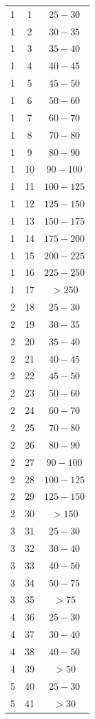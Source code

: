 \begin{center}
\begin{longtable}{|c|c|c|}
\hline 
1 & 1 & $25-30$ \\ 
1 & 2 & $30-35$ \\ 
1 & 3 & $35-40$ \\ 
1 & 4 & $40-45$ \\ 
1 & 5 & $45-50$ \\ 
1 & 6 & $50-60$ \\ 
1 & 7 & $60-70$ \\ 
1 & 8 & $70-80$ \\ 
1 & 9 & $80-90$ \\ 
1 & 10 & $90-100$ \\ 
1 & 11 & $100-125$ \\ 
1 & 12 & $125-150$ \\ 
1 & 13 & $150-175$ \\ 
1 & 14 & $175-200$ \\ 
1 & 15 & $200-225$ \\ 
1 & 16 & $225-250$ \\ 
1 & 17 & $>250$ \\ 
\hline 
2 & 18 & $25-30$ \\ 
2 & 19 & $30-35$ \\ 
2 & 20 & $35-40$ \\ 
2 & 21 & $40-45$ \\ 
2 & 22 & $45-50$ \\ 
2 & 23 & $50-60$ \\ 
2 & 24 & $60-70$ \\ 
2 & 25 & $70-80$ \\ 
2 & 26 & $80-90$ \\ 
2 & 27 & $90-100$ \\ 
2 & 28 & $100-125$ \\ 
2 & 29 & $125-150$ \\ 
2 & 30 & $>150$ \\ 
\hline 
3 & 31 & $25-30$ \\ 
3 & 32 & $30-40$ \\ 
3 & 33 & $40-50$ \\ 
3 & 34 & $50-75$ \\ 
3 & 35 & $>75$ \\ 
\hline 
4 & 36 & $25-30$ \\ 
4 & 37 & $30-40$ \\ 
4 & 38 & $40-50$ \\ 
4 & 39 & $>50$ \\ 
\hline 
5 & 40 & $25-30$ \\ 
5 & 41 & $>30$ \\
\end{longtable}
\end{center}

